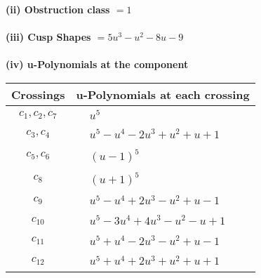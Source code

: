 \documentclass[1p]{elsarticle_modified}
\theoremstyle{definition}
\begin{document}
\flushleft \textbf{(ii) Obstruction class $= 1$}\\~\\
\flushleft \textbf{(iii) Cusp Shapes $= 5 u^3- u^2-8 u-9$}\\~\\
\newpage\renewcommand{\arraystretch}{1}
\flushleft \textbf{(iv) u-Polynomials at the component}\newline \\
\begin{tabular}{m{50pt}|m{274pt}}
Crossings & \hspace{64pt}u-Polynomials at each crossing \\
\hline $$\begin{aligned}c_{1},c_{2},c_{7}\end{aligned}$$&$\begin{aligned}
&u^5
\end{aligned}$\\
\hline $$\begin{aligned}c_{3},c_{4}\end{aligned}$$&$\begin{aligned}
&u^5- u^4-2 u^3+u^2+u+1
\end{aligned}$\\
\hline $$\begin{aligned}c_{5},c_{6}\end{aligned}$$&$\begin{aligned}
&(u-1)^5
\end{aligned}$\\
\hline $$\begin{aligned}c_{8}\end{aligned}$$&$\begin{aligned}
&(u+1)^5
\end{aligned}$\\
\hline $$\begin{aligned}c_{9}\end{aligned}$$&$\begin{aligned}
&u^5- u^4+2 u^3- u^2+u-1
\end{aligned}$\\
\hline $$\begin{aligned}c_{10}\end{aligned}$$&$\begin{aligned}
&u^5-3 u^4+4 u^3- u^2- u+1
\end{aligned}$\\
\hline $$\begin{aligned}c_{11}\end{aligned}$$&$\begin{aligned}
&u^5+u^4-2 u^3- u^2+u-1
\end{aligned}$\\
\hline $$\begin{aligned}c_{12}\end{aligned}$$&$\begin{aligned}
&u^5+u^4+2 u^3+u^2+u+1
\end{aligned}$\\
\hline
\end{tabular}\\~\\
\end{document}

